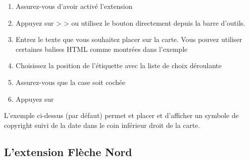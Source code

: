 \begin{enumerate}
\item Assurez-vous d'avoir activé l'extension
\item Appuyez sur  >  >  ou utilisez le bouton  directement depuis la barre d'outils.
\item Entrez le texte que vous souhaitez placer sur la carte. Vous pouvez
  utiliser certaines balises HTML comme montrées dans l'exemple
\item Choisissez la position de l'étiquette avec la liste de choix déroulante\\ 
\item Assurez-vous que la case  soit cochée
\item Appuyez sur  
\end{enumerate}

L'exemple ci-dessus (par défaut) permet et placer et d'afficher un symbole de
copyright suivi de la date dans le coin inférieur droit de la carte.

\subsection{L'extension Flèche Nord}

